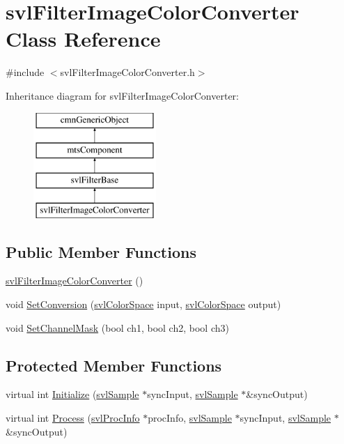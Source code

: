\hypertarget{classsvl_filter_image_color_converter}{\section{svl\-Filter\-Image\-Color\-Converter Class Reference}
\label{classsvl_filter_image_color_converter}
}


{\ttfamily \#include $<$svl\-Filter\-Image\-Color\-Converter.\-h$>$}

Inheritance diagram for svl\-Filter\-Image\-Color\-Converter\-:\begin{figure}[H]
\begin{center}
\leavevmode
\includegraphics[height=4.000000cm]{d8/d50/classsvl_filter_image_color_converter}
\end{center}
\end{figure}
\subsection*{Public Member Functions}
\begin{DoxyCompactItemize}
\item 
\hyperlink{classsvl_filter_image_color_converter_abfb774f943487255c13472f0bf20c2c9}{svl\-Filter\-Image\-Color\-Converter} ()
\item 
void \hyperlink{classsvl_filter_image_color_converter_acd229ef87ef678b310e60f689ce2da0e}{Set\-Conversion} (\hyperlink{svl_definitions_8h_a4900d9f4fac6e7b445742715a3a4c254}{svl\-Color\-Space} input, \hyperlink{svl_definitions_8h_a4900d9f4fac6e7b445742715a3a4c254}{svl\-Color\-Space} output)
\item 
void \hyperlink{classsvl_filter_image_color_converter_abeb8be823a3bced7cbfa32fada84d348}{Set\-Channel\-Mask} (bool ch1, bool ch2, bool ch3)
\end{DoxyCompactItemize}
\subsection*{Protected Member Functions}
\begin{DoxyCompactItemize}
\item 
virtual int \hyperlink{classsvl_filter_image_color_converter_a8cfddbaa6db791510f11ce1fead60e26}{Initialize} (\hyperlink{classsvl_sample}{svl\-Sample} $\ast$sync\-Input, \hyperlink{classsvl_sample}{svl\-Sample} $\ast$\&sync\-Output)
\item 
virtual int \hyperlink{classsvl_filter_image_color_converter_a28479834b3234c121305b084ccc8a220}{Process} (\hyperlink{structsvl_proc_info}{svl\-Proc\-Info} $\ast$proc\-Info, \hyperlink{classsvl_sample}{svl\-Sample} $\ast$sync\-Input, \hyperlink{classsvl_sample}{svl\-Sample} $\ast$\&sync\-Output)
\end{DoxyCompactItemize}
